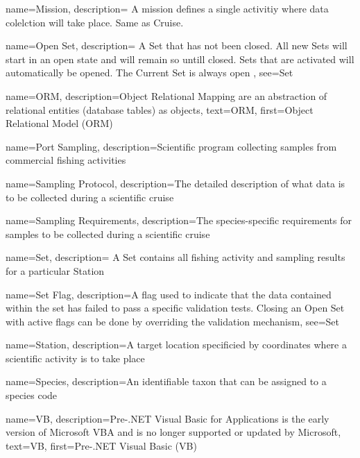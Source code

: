  {
    name=Mission,
    description={
        A mission defines a single activitiy where data colelction will take place. Same as \gls{Cruise}.
    }
}

 {
    name=Open Set,
    description={
        A \gls{Set} that has not been closed. All new Sets will start in an open state and will remain so untill closed.
        Sets that are activated will automatically be opened.
        The \gls{Current Set} is always open
    },
    see={Set}
}

 {
    name=ORM,
    description={Object Relational Mapping are an abstraction of relational entities (database tables) as objects},
    text={ORM},
    first={Object Relational Model (ORM)}
}

 {
    name=Port Sampling,
    description={Scientific program collecting samples from commercial fishing activities}
}

 {
    name=Sampling Protocol,
    description={The detailed description of what data is to be collected during a scientific cruise}
}

 {
    name=Sampling Requirements,
    description={The species-specific requirements for samples to be collected during a scientific cruise}
}

 {
    name=Set,
    description={
        A Set contains all fishing activity and sampling results for a particular \gls{Station}
    }
}

 {
    name=Set Flag,
    description={A flag used to indicate that the data contained within the set has failed to pass a specific validation tests.
    Closing an \gls{Open Set} with active flags can be done by overriding the validation mechanism},
    see=\gls{Set}
}

 {
    name=Station,
    description={A target location specificied by coordinates where a scientific activity is to take place}
}

 {
    name=Species,
    description={An identifiable taxon that can be assigned to a species code}
}

 {
    name=VB,
    description={Pre-.NET Visual Basic for Applications is the early version of Microsoft VBA and is no longer supported or updated by Microsoft},
    text={VB},
    first={Pre-.NET Visual Basic (VB)}
}

